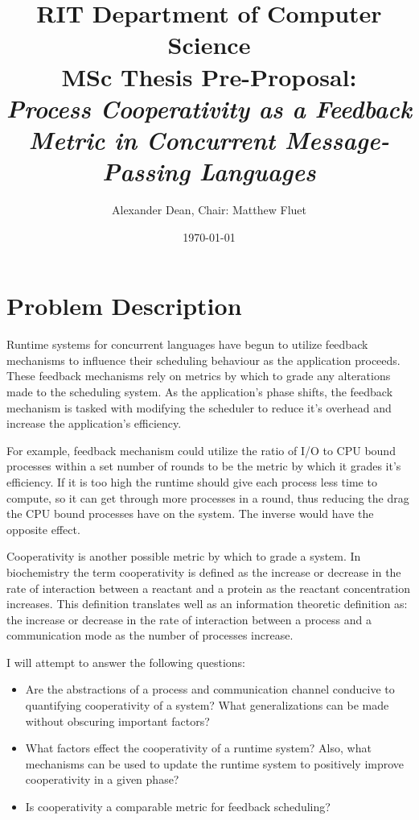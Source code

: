 \documentclass[11pt]{artikel3}
\title{RIT Department of Computer Science\\MSc Thesis Pre-Proposal:\\
	\emph{Process Cooperativity as a Feedback Metric in Concurrent Message-Passing Languages}
}
\author{Alexander Dean, Chair: Matthew Fluet}
\date{\today}
\begin{document}
\maketitle

\section{Problem Description}

Runtime systems for concurrent languages have begun to utilize feedback mechanisms to influence their 
scheduling behaviour as the application proceeds. These feedback mechanisms rely on metrics by which to 
grade any alterations made to the scheduling system. As the application's phase shifts, the feedback mechanism
is tasked with modifying the scheduler to reduce it's overhead and increase the application's efficiency.

For example, feedback mechanism could utilize the ratio of I/O to CPU bound processes within a set number 
of rounds to be the metric by which it grades it's efficiency. If it is too high the runtime should give
each process less time to compute, so it can get through more processes in a round, thus reducing the drag
the CPU bound processes have on the system. The inverse would have the opposite effect.

Cooperativity is another possible metric by which to grade a system. In biochemistry the term cooperativity 
is defined as the increase or decrease in the rate of interaction between a reactant and a protein as 
the reactant concentration increases. This definition translates well as an information theoretic definition 
as: the increase or decrease in the rate of interaction between a process and a communication mode as the 
number of processes increase.


I will attempt to answer the following questions:
\begin{itemize}[leftmargin=.5in]
	\item Are the abstractions of a process and communication channel conducive to quantifying 
		  cooperativity of a system? What generalizations can be made without obscuring important 
		  factors?
	\item What factors effect the cooperativity of a runtime system? Also, what mechanisms can be used 
		  to update the runtime system to positively improve cooperativity in a given phase?
	\item Is cooperativity a comparable metric for feedback scheduling?
\end{itemize}
\end{document}
